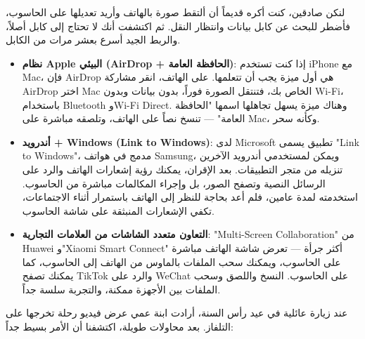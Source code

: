 


لنكن صادقين، كنت أكره قديماً أن ألتقط صورة بالهاتف وأريد تعديلها على الحاسوب، فأضطر للبحث عن كابل بيانات وانتظار النقل. ثم اكتشفت أنك لا تحتاج إلى كابل أصلاً، والربط الجيد أسرع بعشر مرات من الكابل.

\begin{itemize}
  \item \textbf{نظام Apple البيئي (AirDrop + الحافظة العامة)}: إذا كنت تستخدم iPhone مع Mac، فإن AirDrop هي أول ميزة يجب أن تتعلمها. على الهاتف، انقر مشاركة AirDrop اختر Mac الخاص بك، فتنتقل الصورة فوراً، بدون بيانات وبدون Wi-Fi، باستخدام Bluetooth وWi-Fi Direct. وهناك ميزة يسهل تجاهلها اسمها "الحافظة العامة" — تنسخ نصاً على الهاتف، وتلصقه مباشرة على Mac، وكأنه سحر.
  \item \textbf{أندرويد + Windows (Link to Windows)}: لدى Microsoft تطبيق يسمى "Link to Windows"، مدمج في هواتف Samsung، ويمكن لمستخدمي أندرويد الآخرين تنزيله من متجر التطبيقات. بعد الإقران، يمكنك رؤية إشعارات الهاتف والرد على الرسائل النصية وتصفح الصور، بل وإجراء المكالمات مباشرة من الحاسوب. استخدمته لمدة عامين، فلم أعد بحاجة للنظر إلى الهاتف باستمرار أثناء الاجتماعات، تكفي الإشعارات المنبثقة على شاشة الحاسوب.
  \item \textbf{التعاون متعدد الشاشات من العلامات التجارية}: "Multi-Screen Collaboration" من Huawei و"Xiaomi Smart Connect" أكثر جرأة — تعرض شاشة الهاتف مباشرة على الحاسوب، ويمكنك سحب الملفات بالماوس من الهاتف إلى الحاسوب، كما يمكنك تصفح TikTok والرد على WeChat على الحاسوب. النسخ واللصق وسحب الملفات بين الأجهزة ممكنة، والتجربة سلسة جداً.
\end{itemize}


عند زيارة عائلية في عيد رأس السنة، أرادت ابنة عمي عرض فيديو رحلة تخرجها على التلفاز. بعد محاولات طويلة، اكتشفنا أن الأمر بسيط جداً:

